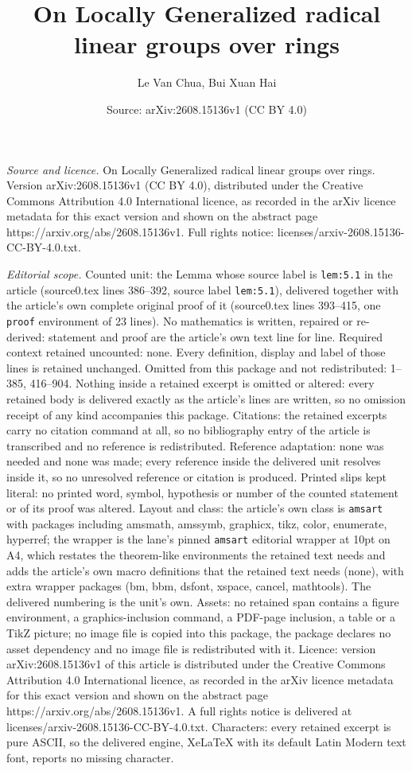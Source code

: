 \documentclass[10pt,a4paper]{amsart}
\title[On Locally Generalized radical linear groups over rings]{On Locally Generalized radical linear groups over rings}
\author{Le Van Chua, Bui Xuan Hai}
\date{Source: arXiv:2608.15136v1 (CC BY 4.0)}
\begin{document}
\maketitle

\noindent\emph{Source and licence.} On Locally Generalized radical linear groups over rings. Version arXiv:2608.15136v1 (CC BY 4.0), distributed under the Creative Commons Attribution 4.0 International licence, as recorded in the arXiv licence metadata for this exact version and shown on the abstract page https://arxiv.org/abs/2608.15136v1. Full rights notice: licenses/arxiv-2608.15136-CC-BY-4.0.txt.\par\smallskip

\noindent\textit{Editorial scope.} Counted unit: the Lemma whose source label is \texttt{lem:5.1} in the article (source0.tex lines 386--392, source label \texttt{lem:5.1}), delivered together with the article's own complete original proof of it (source0.tex lines 393--415, one \texttt{proof} environment of 23 lines). No mathematics is written, repaired or re-derived: statement and proof are the article's own text line for line. Required context retained uncounted: none. Every definition, display and label of those lines is retained unchanged. Omitted from this package and not redistributed: 1--385, 416--904. Nothing inside a retained excerpt is omitted or altered: every retained body is delivered exactly as the article's lines are written, so no omission receipt of any kind accompanies this package. Citations: the retained excerpts carry no citation command at all, so no bibliography entry of the article is transcribed and no reference is redistributed. Reference adaptation: none was needed and none was made; every reference inside the delivered unit resolves inside it, so no unresolved reference or citation is produced. Printed slips kept literal: no printed word, symbol, hypothesis or number of the counted statement or of its proof was altered. Layout and class: the article's own class is \texttt{amsart} with packages including amsmath, amssymb, graphicx, tikz, color, enumerate, hyperref; the wrapper is the lane's pinned \texttt{amsart} editorial wrapper at 10pt on A4, which restates the theorem-like environments the retained text needs and adds the article's own macro definitions that the retained text needs (none), with extra wrapper packages (bm, bbm, dsfont, xspace, cancel, mathtools). The delivered numbering is the unit's own. Assets: no retained span contains a figure environment, a graphics-inclusion command, a PDF-page inclusion, a table or a TikZ picture; no image file is copied into this package, the package declares no asset dependency and no image file is redistributed with it. Licence: version arXiv:2608.15136v1 of this article is distributed under the Creative Commons Attribution 4.0 International licence, as recorded in the arXiv licence metadata for this exact version and shown on the abstract page https://arxiv.org/abs/2608.15136v1. A full rights notice is delivered at licenses/arxiv-2608.15136-CC-BY-4.0.txt. Characters: every retained excerpt is pure ASCII, so the delivered engine, XeLaTeX with its default Latin Modern text font, reports no missing character.
\end{document}
